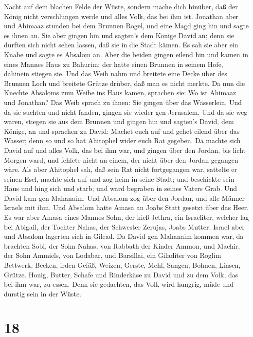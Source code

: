 Nacht auf dem blachen Felde der Wüste, sondern mache dich hinüber, daß
der König nicht verschlungen werde und alles Volk, das bei ihm ist.
 Jonathan aber und Ahimaaz stunden bei dem Brunnen Rogel,
und eine Magd ging hin und sagte es ihnen an. Sie aber gingen hin und
sagten's dem Könige David an; denn sie durften sich nicht sehen lassen,
daß sie in die Stadt kämen.  Es sah sie aber ein Knabe und
sagte es Absalom an. Aber die beiden gingen eilend hin und kamen in
eines Mannes Haus zu Bahurim; der hatte einen Brunnen in seinem Hofe,
dahinein stiegen sie.  Und das Weib nahm und breitete eine
Decke über des Brunnen Loch und breitete Grütze drüber, daß man es nicht
merkte.  Da nun die Knechte Absaloms zum Weibe ins Haus
kamen, sprachen sie: Wo ist Ahimaaz und Jonathan? Das Weib sprach zu
ihnen: Sie gingen über das Wässerlein. Und da sie suchten und nicht
fanden, gingen sie wieder gen Jerusalem.  Und da sie weg
waren, stiegen sie aus dem Brunnen und gingen hin und sagten's David,
dem Könige, an und sprachen zu David: Machet euch auf und gehet eilend
über das Wasser; denn so und so hat Ahitophel wider euch Rat gegeben.
 Da machte sich David auf und alles Volk, das bei ihm war,
und gingen über den Jordan, bis licht Morgen ward, und fehlete nicht an
einem, der nicht über den Jordan gegangen wäre.  Als aber
Ahitophel sah, daß sein Rat nicht fortgegangen war, sattelte er seinen
Esel, machte sich auf und zog heim in seine Stadt; und beschickte sein
Haus und hing sich und starb; und ward begraben in seines Vaters Grab.
 Und David kam gen Mahanaim. Und Absalom zog über den
Jordan, und alle Männer Israels mit ihm.  Und Absalom hatte
Amasa an Joabs Statt gesetzt über das Heer. Es war aber Amasa eines
Mannes Sohn, der hieß Jethra, ein Israeliter, welcher lag bei Abigail,
der Tochter Nahas, der Schwester Zerujas, Joabs Mutter. 
Israel aber und Absalom lagerten sich in Gilead.  Da David
gen Mahanaim kommen war, da brachten Sobi, der Sohn Nahas, von Rabbath
der Kinder Ammon, und Machir, der Sohn Ammiels, von Lodabar, und
Barsillai, ein Giladiter von Roglim  Bettwerk, Becken,
irden Gefäß, Weizen, Gerste, Mehl, Sangen, Bohnen, Linsen, Grütze.
 Honig, Butter, Schafe und Rinderkäse zu David und zu dem
Volk, das bei ihm war, zu essen. Denn sie gedachten, das Volk wird
hungrig, müde und durstig sein in der Wüste.

\hypertarget{section-17}{%
\section{18}\label{section-17}}

